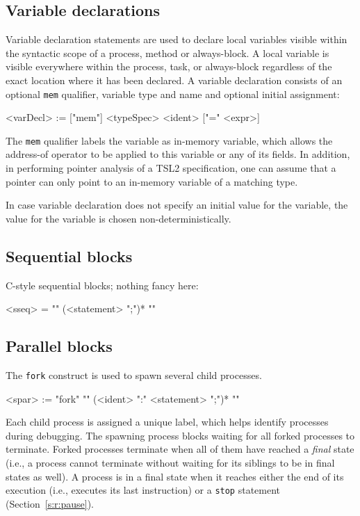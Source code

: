 \documentclass{report}
\newcommand{\src}[1]{\texttt{#1}}
\newcommand{\tsl}{TSL2 }
\begin{document}
\subsection{Variable declarations}\label{s:r:localvar}

Variable declaration statements are used to declare local 
variables visible within the syntactic scope of a process, method 
or always-block.  A local variable is visible everywhere within 
the process, task, or always-block regardless of the exact 
location where it has been declared.  A variable declaration 
consists of an optional \src{mem} qualifier, variable type and 
name and optional initial assignment:
\begin{bnflisting}{}
<varDecl> := ["mem"] <typeSpec> <ident> ["=" <expr>]
\end{bnflisting}
The \src{mem} qualifier labels the variable as in-memory variable,
which allows the address-of operator to be applied to this 
variable or any of its fields.  In addition, in performing pointer 
analysis of a \tsl specification, one can assume that a pointer 
can only point to an in-memory variable of a matching type.

In case variable declaration does not specify an initial value for 
the variable, the value for the variable is chosen 
non-deterministically.

\subsection{Sequential blocks} 

C-style sequential blocks; nothing fancy here:
\begin{bnflisting}{}
<sseq> = "{" (<statement> ";")* "}"
\end{bnflisting}

\subsection{Parallel blocks}\label{s:r:fork}

The \src{fork} construct is used to spawn several child processes.  
\begin{bnflisting}{}
<spar> := "fork" "{" 
               (<ident> ":" <statement> ";")*
          "}"
\end{bnflisting}
Each child process is assigned a unique label, which helps 
identify processes during debugging.  The spawning process blocks 
waiting for all forked processes to terminate.  Forked processes 
terminate when all of them have reached a \emph{final} state 
(i.e., a process cannot terminate without waiting for its siblings 
to be in final states as well).  A process is in a final state 
when it reaches either the end of its execution (i.e., executes 
its last instruction) or a \src{stop} statement 
(Section~\ref{s:r:pause}).  
\end{document}
